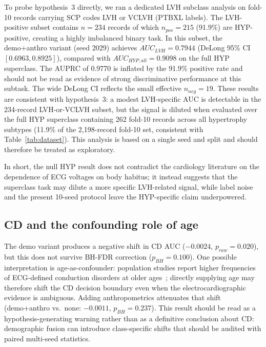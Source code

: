 \documentclass[mathematics,article,submit,pdftex]{Definitions/mdpi}
\def\texttt#1{#1}%
\def\mathrm#1{#1}%
\begin{document}
To probe hypothesis~3 directly, we ran a dedicated LVH subclass analysis on fold-10 records carrying SCP codes \texttt{LVH} or \texttt{VCLVH} (PTBXL labels). The LVH-positive subset contains $n{=}234$ records of which $n_{\mathrm{pos}}{=}215$ (91.9\%) are HYP-positive, creating a highly imbalanced binary task. In this subset, the \texttt{demo+anthro} variant (seed 2029) achieves $\mathrm{AUC}_{\mathrm{LVH}}{=}0.7944$ (DeLong 95\% CI $[0.6963, 0.8925]$), compared with $\mathrm{AUC}_{\mathrm{HYP,all}}{=}0.9098$ on the full HYP superclass. The AUPRC of 0.9770 is inflated by the 91.9\% positive rate and should not be read as evidence of strong discriminative performance at this subtask. The wide DeLong CI reflects the small effective $n_{\mathrm{neg}}{=}19$. These results are consistent with hypothesis~3: a modest LVH-specific AUC is detectable in the 234-record LVH-or-VCLVH subset, but the signal is diluted when evaluated over the full HYP superclass containing 262 fold-10 records across all hypertrophy subtypes (11.9\% of the 2{,}198-record fold-10 set, consistent with Table~\ref{tab:dataset}). This analysis is based on a single seed and split and should therefore be treated as exploratory.

In short, the null HYP result does not contradict the cardiology literature on the dependence of ECG voltages on body habitus; it instead suggests that the superclass task may dilute a more specific LVH-related signal, while label noise and the present 10-seed protocol leave the HYP-specific claim underpowered.

\subsection{CD and the confounding role of age}
The \texttt{demo} variant produces a negative shift in CD AUC ($-0.0024$, $p_{\mathrm{raw}}{=}0.020$), but this does not survive BH-FDR correction ($p_{\mathrm{BH}}{=}0.100$). One possible interpretation is age-as-confounder: population studies report higher frequencies of ECG-defined conduction disorders at older ages~\cite{Haimovich2024}; directly supplying age may therefore shift the CD decision boundary even when the electrocardiographic evidence is ambiguous. Adding anthropometrics attenuates that shift (\texttt{demo+anthro} vs.\ \texttt{none}: $-0.0011$, $p_{\mathrm{BH}}{=}0.237$). This result should be read as a hypothesis-generating warning rather than as a definitive conclusion about CD: demographic fusion can introduce class-specific shifts that should be audited with paired multi-seed statistics.
\end{document}

